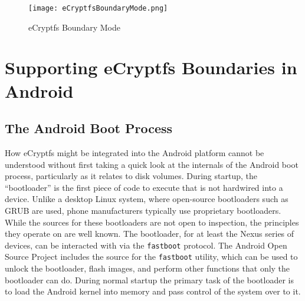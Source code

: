 \begin{figure}[ht] \begin{center}
\texttt{[image: eCryptfsBoundaryMode.png]}\end{center}
\caption{eCryptfs Boundary Mode} \label{fig:ecryptfsboundary} \end{figure}

\section{Supporting eCryptfs Boundaries in Android}

\subsection{The Android Boot Process}
How eCryptfs might be integrated into the Android platform cannot be understood without first taking a quick look at the internals
of the Android boot process, particularly as it relates to disk volumes. During startup, the ``bootloader'' is the first piece of
code to execute that is not hardwired into a device. Unlike a desktop Linux system, where open-source bootloaders such as GRUB are
used, phone manufacturers typically use proprietary bootloaders. While the sources for these bootloaders are not open to inspection,
the principles they operate on are well known. The bootloader, for at least the Nexus series of devices, can be interacted with via
the \texttt{fastboot} protocol. The Android Open Source Project includes the source for the \texttt{fastboot} utility, which can be
used to unlock the bootloader, flash images, and perform other functions that only the bootloader can do.  During normal startup the
primary task of the bootloader is to load the Android kernel into memory and pass control of the system over to it. 

